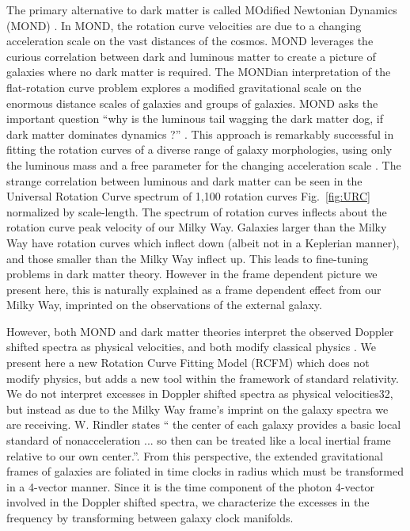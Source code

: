 \documentclass[reprint,%
 amsmath,amssymb,
 aps,
]{revtex4-1}
\begin{document}
    The primary 
 alternative to dark matter is called   MOdified Newtonian Dynamics (MOND) \cite{Milgrom}.  
 In MOND, the rotation curve velocities are due to a changing acceleration scale on the vast distances of the cosmos.  
 MOND leverages the curious correlation between dark and luminous matter \cite{McGaugh_2014} to create a picture of  galaxies where no dark matter is required. 
 The MONDian    interpretation  of the flat-rotation curve problem explores a modified gravitational scale  on the enormous distance scales of galaxies and groups of galaxies.   
 MOND asks the important question ``why is the luminous tail wagging the dark matter dog,  if dark matter dominates dynamics ?'' \cite{1999McGaugh}.
 This approach  is remarkably successful in fitting the rotation curves  of a diverse range  of galaxy morphologies,   using only the luminous mass and a free parameter for the changing acceleration scale \cite{McGaugh2016RAR}.
 The strange correlation between luminous and  dark matter  can be seen in the Universal Rotation Curve spectrum of 1,100 rotation curves Fig.~\ref{fig:URC} normalized by scale-length. The spectrum of rotation curves inflects about   the rotation curve peak velocity of our Milky Way. Galaxies larger than the Milky Way have rotation curves which inflect down (albeit not in a Keplerian manner), and those   smaller than the Milky Way inflect up.  This leads to fine-tuning problems in  dark matter theory.   However in the frame dependent picture we present here, this is naturally explained as a frame dependent effect from our Milky Way, imprinted on the observations of the external galaxy. 
  

However, both MOND and dark matter theories interpret the observed Doppler shifted spectra as physical velocities, and both modify classical physics \cite{de_Blok_2010}.   
We   present here a new Rotation Curve Fitting Model (RCFM) which does not   modify physics, but adds a new tool within the framework of standard relativity. 
We do not interpret excesses in Doppler shifted spectra as physical velocities32, but instead as due to the Milky Way frame's imprint on the galaxy spectra we are receiving. 
  W.    Rindler states    `` the center of each galaxy provides a basic local standard of nonacceleration ... so then can be treated like a local inertial frame relative to our own center.''\cite{rindler2013essential}. 
  From this perspective, the extended gravitational frames of galaxies are foliated in      time clocks in radius which must be transformed in a 4-vector manner.  Since it is the time component of the photon 4-vector involved in the Doppler shifted spectra, we characterize the excesses in the frequency by transforming between  galaxy   clock manifolds. 
  
\end{document}
